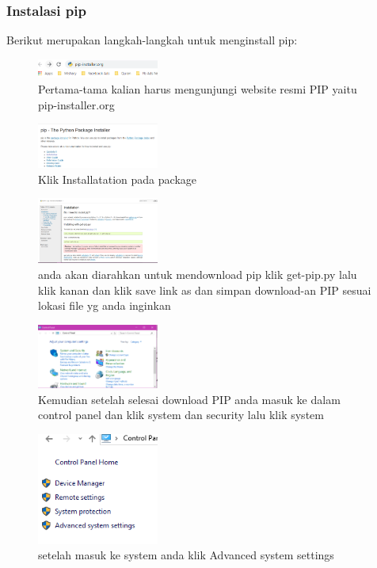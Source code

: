 \subsubsection{Instalasi pip}
Berikut merupakan langkah-langkah untuk menginstall pip:
	\begin{figure}[H]
		\includegraphics[width=4cm]{figures/1184065/downloadPIP.PNG}
		\centering
		\caption{Pertama-tama kalian harus mengunjungi website resmi PIP yaitu pip-installer.org}
	\end{figure}
	\begin{figure}[H]
		\includegraphics[width=4cm]{figures/1184065/PilihInstaller.PNG}
		\centering
		\caption{Klik Installatation pada package}
	\end{figure}
	\begin{figure}[H]
		\includegraphics[width=4cm]{figures/1184065/KlikGetPip.PNG}
		\centering
		\caption{anda akan diarahkan untuk mendownload pip klik get-pip.py lalu klik kanan dan klik save link as dan simpan download-an PIP sesuai lokasi file yg anda inginkan}
	\end{figure}
	\begin{figure}[H]
		\includegraphics[width=4cm]{figures/1184065/SystemPIP.PNG}
		\centering
		\caption{Kemudian setelah selesai download PIP anda masuk ke dalam control panel dan klik system dan security lalu klik system }
		\end{figure}
		\begin{figure}[H]
		\includegraphics[width=4cm]{figures/1184065/PIPAdvanced.PNG}
		\centering
		\caption{setelah masuk ke system anda klik Advanced system settings}
	\end{figure}
